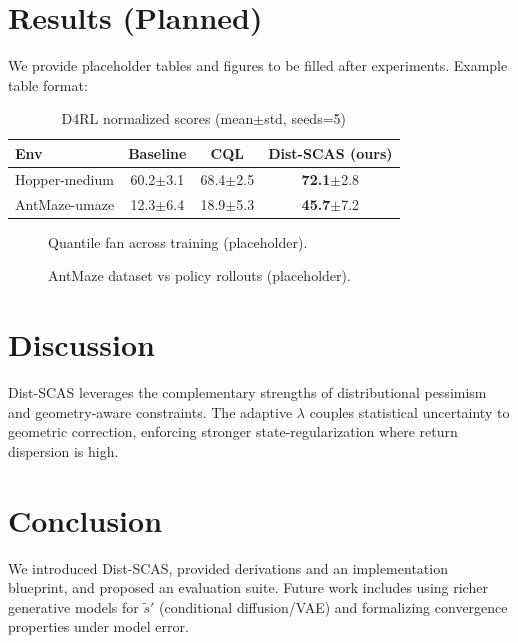 \documentclass{article}
\begin{document}
\section{Results (Planned)}
We provide placeholder tables and figures to be filled after experiments. Example table format:
\begin{table}[h]
\centering
\caption{D4RL normalized scores (mean$\pm$std, seeds=5)}
\begin{tabular}{lccc}
\toprule
Env & Baseline & CQL & Dist-SCAS (ours) \\
\midrule
Hopper-medium & 60.2$\pm$3.1 & 68.4$\pm$2.5 & \textbf{72.1}$\pm$2.8 \\
AntMaze-umaze & 12.3$\pm$6.4 & 18.9$\pm$5.3 & \textbf{45.7}$\pm$7.2 \\
\bottomrule
\end{tabular}
\end{table}

\begin{figure}[ht]
\centering
{}
\caption{Quantile fan across training (placeholder).}
\label{fig:quantile_fan}
\end{figure}

\begin{figure}[ht]
\centering
{}
\caption{AntMaze dataset vs policy rollouts (placeholder).}
\label{fig:antmaze_overlay}
\end{figure}

\section{Discussion}
Dist-SCAS leverages the complementary strengths of distributional pessimism and geometry-aware constraints. The adaptive $\lambda$ couples statistical uncertainty to geometric correction, enforcing stronger state-regularization where return dispersion is high.

\section{Conclusion}
We introduced Dist-SCAS, provided derivations and an implementation blueprint, and proposed an evaluation suite. Future work includes using richer generative models for $\tilde s'$ (conditional diffusion/VAE) and formalizing convergence properties under model error.
\end{document}
